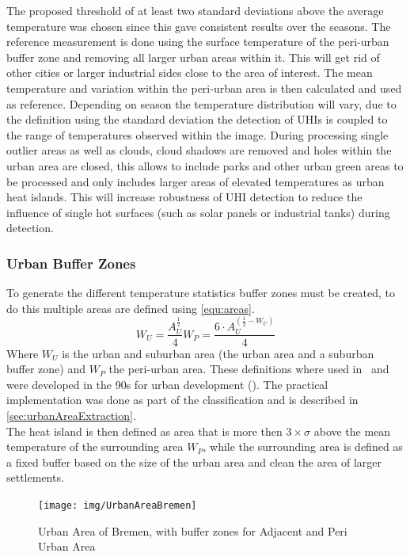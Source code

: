 \documentclass[12pt,a4paper, english,twoside]{article}
\begin{document}
    The proposed threshold of at least two standard deviations above the average temperature was chosen since this gave consistent results over the seasons. %
    The reference measurement is done using the surface temperature of the peri-urban buffer zone and removing all larger urban areas within it. 
    This will get rid of other cities or larger industrial sides close to the area of interest.
    The mean temperature and variation within the peri-urban area is then calculated and used as reference.
    Depending on season the temperature distribution will vary, due to the definition using the standard deviation the detection of \glspl{UHI} is coupled to the range of temperatures observed within the image. 
    During processing single outlier areas as well as clouds, cloud shadows are removed and holes within the urban area are closed, this allows to include parks and other urban green areas to be processed and only includes larger areas of elevated temperatures as urban heat islands. 
    This will increase robustness of \gls{UHI} detection to reduce the influence of single hot surfaces (such as solar panels or industrial tanks) during detection.

    \subsubsection{Urban Buffer Zones}\label{sec:urbanBufferzone}
      To generate the different temperature statistics buffer zones must be created, to do this multiple areas are defined using \cref{equ:areas}.
%
      \begin{equation}\label{equ:areas}
	      W_U = \frac{A_U^{\frac{1}{2}}}{4}
	      W_P = \frac{6\cdot A_U^{(\frac{1}{2}-W_U)}}{4}
      \end{equation}
      Where $W_U$ is the urban and suburban area (the urban area and a suburban buffer zone) and $W_P$ the peri-urban area.
      These definitions where used in~\cite{Sobrino2020} and were developed in the 90s for urban development (\cite{AlkanBala2014}).
      The practical implementation was done as part of the classification and is described in \cref{sec:urbanAreaExtraction}. \\
      The heat island is then defined as area that is more then $3\times \sigma$ above the mean temperature of the surrounding area $W_P$, while the surrounding area is defined as a fixed buffer based on the size of the urban area and clean the area of larger settlements. 
      \begin{figure}
        \texttt{[image: img/UrbanAreaBremen]}
        \caption{Urban Area of Bremen, with buffer zones for Adjacent and Peri Urban Area\label{fig:bufferedBremen}}
      \end{figure}
%
\end{document}
